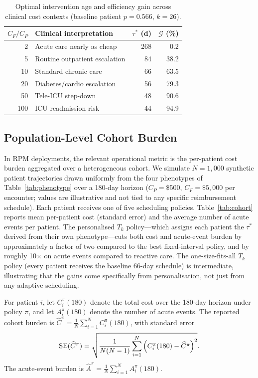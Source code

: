 \documentclass[pdflatex,sn-mathphys-num]{sn-jnl}
\theoremstyle{definition}
\numberwithin{equation}{section}
\begin{document}
\begin{table}[htbp]
\centering
\caption{Optimal intervention age and efficiency gain across clinical cost contexts (baseline patient $p=0.566$, $k=26$).}
\label{tab:cost_scan}
\small
\begin{tabular}{rlrr}
\toprule
$C_F/C_P$ & Clinical interpretation & $\tau^*$ (d) & $\mathcal{G}$ (\%) \\
\midrule
2   & Acute care nearly as cheap     & 268 & 0.2 \\
5   & Routine outpatient escalation  &  84 & 38.2 \\
10  & Standard chronic care          &  66 & 63.5 \\
20  & Diabetes/cardio escalation     &  56 & 79.3 \\
50  & Tele-ICU step-down             &  48 & 90.6 \\
100 & ICU readmission risk           &  44 & 94.9 \\
\bottomrule
\end{tabular}
\end{table}

\subsection{Population-Level Cohort Burden}\label{sec:case_cohort}

In RPM deployments, the relevant operational metric is the per-patient cost burden aggregated over a heterogeneous cohort. We simulate $N{=}1{,}000$ synthetic patient trajectories drawn uniformly from the four phenotypes of Table~\ref{tab:phenotype} over a 180-day horizon ($C_P{=}\$500$, $C_F{=}\$5{,}000$ per encounter; values are illustrative and not tied to any specific reimbursement schedule). Each patient receives one of five scheduling policies. Table~\ref{tab:cohort} reports mean per-patient cost (standard error) and the average number of acute events per patient. The personalised $T_k$ policy---which assigns each patient the $\tau^*$ derived from their own phenotype---cuts both cost and acute-event burden by approximately a factor of two compared to the best fixed-interval policy, and by roughly 10$\times$ on acute events compared to reactive care. The one-size-fits-all $T_k$ policy (every patient receives the baseline 66-day schedule) is intermediate, illustrating that the gains come specifically from personalisation, not just from any adaptive scheduling.

For patient \(i\), let \(C_i^\pi(180)\) denote the total cost over the
180-day horizon under policy \(\pi\), and let \(A_i^\pi(180)\) denote the
number of acute events. The reported cohort burden is
$\displaystyle \widehat C^\pi
=
\frac1N\sum_{i=1}^N C_i^\pi(180)$,
with standard error
\[
{\rm SE}(\widehat C^\pi)
=
\sqrt{
\frac{1}{N(N-1)}
\sum_{i=1}^N
\left(C_i^\pi(180)-\widehat C^\pi\right)^2
}.
\]
The acute-event burden is
$\displaystyle \widehat A^\pi
=
\frac1N\sum_{i=1}^N A_i^\pi(180)$.
\end{document}
